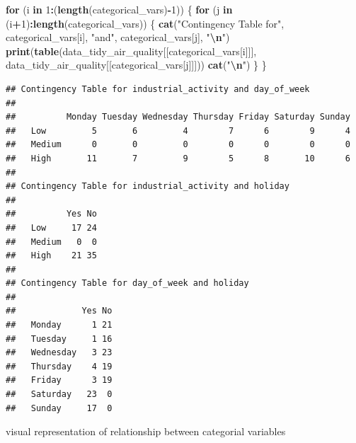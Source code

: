 \documentclass[12pt,halfline,a4paper,]{ouparticle}
\newenvironment{Shaded}{\begin{snugshade}}{\end{snugshade}}
\newcommand{\ControlFlowTok}[1]{\textcolor[rgb]{0.13,0.29,0.53}{\textbf{#1}}}
\newcommand{\DecValTok}[1]{\textcolor[rgb]{0.00,0.00,0.81}{#1}}
\newcommand{\FunctionTok}[1]{\textcolor[rgb]{0.13,0.29,0.53}{\textbf{#1}}}
\newcommand{\NormalTok}[1]{#1}
\newcommand{\SpecialCharTok}[1]{\textcolor[rgb]{0.81,0.36,0.00}{\textbf{#1}}}
\newcommand{\StringTok}[1]{\textcolor[rgb]{0.31,0.60,0.02}{#1}}
\begin{document}
\begin{Shaded}
\begin{Highlighting}[]
\ControlFlowTok{for}\NormalTok{ (i }\ControlFlowTok{in} \DecValTok{1}\SpecialCharTok{:}\NormalTok{(}\FunctionTok{length}\NormalTok{(categorical\_vars)}\SpecialCharTok{{-}}\DecValTok{1}\NormalTok{)) \{}
  \ControlFlowTok{for}\NormalTok{ (j }\ControlFlowTok{in}\NormalTok{ (i}\SpecialCharTok{+}\DecValTok{1}\NormalTok{)}\SpecialCharTok{:}\FunctionTok{length}\NormalTok{(categorical\_vars)) \{}
    \FunctionTok{cat}\NormalTok{(}\StringTok{"Contingency Table for"}\NormalTok{, categorical\_vars[i], }\StringTok{"and"}\NormalTok{, categorical\_vars[j], }\StringTok{"}\SpecialCharTok{\textbackslash{}n}\StringTok{"}\NormalTok{)}
    \FunctionTok{print}\NormalTok{(}\FunctionTok{table}\NormalTok{(data\_tidy\_air\_quality[[categorical\_vars[i]]], data\_tidy\_air\_quality[[categorical\_vars[j]]]))}
    \FunctionTok{cat}\NormalTok{(}\StringTok{"}\SpecialCharTok{\textbackslash{}n}\StringTok{"}\NormalTok{)}
\NormalTok{  \}}
\NormalTok{\}}
\end{Highlighting}
\end{Shaded}

\begin{verbatim}
## Contingency Table for industrial_activity and day_of_week 
##         
##          Monday Tuesday Wednesday Thursday Friday Saturday Sunday
##   Low         5       6         4        7      6        9      4
##   Medium      0       0         0        0      0        0      0
##   High       11       7         9        5      8       10      6
## 
## Contingency Table for industrial_activity and holiday 
##         
##          Yes No
##   Low     17 24
##   Medium   0  0
##   High    21 35
## 
## Contingency Table for day_of_week and holiday 
##            
##             Yes No
##   Monday      1 21
##   Tuesday     1 16
##   Wednesday   3 23
##   Thursday    4 19
##   Friday      3 19
##   Saturday   23  0
##   Sunday     17  0
\end{verbatim}

visual representation of relationship between categorial variables
\end{document}
